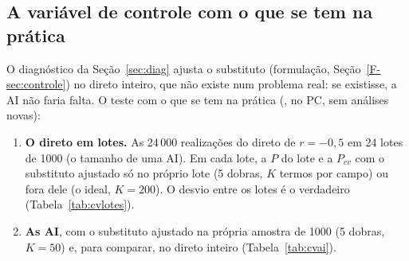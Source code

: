 \documentclass[11pt,a4paper]{article}
\begin{document}
\subsection{A variável de controle com o que se tem na prática}\label{sec:cvlocal}
O diagnóstico da Seção~\ref{sec:diag} ajusta o substituto (formulação, Seção~\ref{F-sec:controle}) no direto inteiro, que
não existe num problema real: se existisse, a AI não faria falta. O teste com o que se tem na prática
(, no PC, sem análises novas):
\begin{enumerate}
  \item \textbf{O direto em lotes.} As 24\,000 realizações do direto de
    $r = -0{,}5$ em 24 lotes de 1000 (o tamanho de uma
    AI). Em cada lote, a $P$ do lote e a $P_{cv}$ com o substituto ajustado só no próprio lote (5 dobras, $K$ termos por
    campo) ou fora dele (o ideal, $K = 200$). O desvio entre os lotes é o verdadeiro (Tabela~\ref{tab:cvlotes}).
  \item \textbf{As AI}, com o substituto ajustado na própria amostra de 1000 (5 dobras, $K = 50$) e, para comparar, no
    direto inteiro (Tabela~\ref{tab:cvai}).
\end{enumerate}
\begin{table}[H]\centering\small
{}
\caption{O direto de $r = -0{,}5$ em lotes de 1000. O ganho é a razão das variâncias entre os
lotes. A $P_f$ do direto inteiro é 1{,}700\,\%.}\label{tab:cvlotes}
\end{table}
\end{document}
